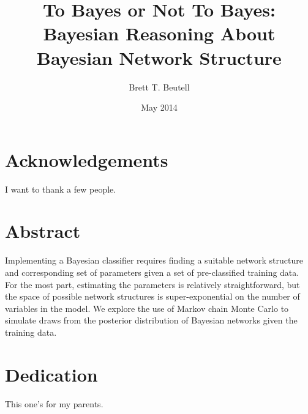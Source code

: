 \documentclass[12pt,twoside]{reedthesis}
\title{To Bayes or Not To Bayes: Bayesian Reasoning About Bayesian Network Structure}
\author{Brett T. Beutell}
\date{May 2014}
\begin{document}
  \maketitle
  \frontmatter %
  \pagestyle{empty} %

    \chapter*{Acknowledgements}
	I want to thank a few people.


    \tableofcontents

    \chapter*{Abstract}
	Implementing a Bayesian classifier requires finding a suitable network structure and corresponding set of parameters given a set of pre-classified training data. For the most part, estimating the parameters is relatively straightforward, but the space of possible network structures is super-exponential on the number of variables in the model. We explore the use of Markov chain Monte Carlo to simulate draws from the posterior distribution of Bayesian networks given the training data.
	
	\chapter*{Dedication}
	This one's for my parents.

  \mainmatter %
  \pagestyle{fancyplain} %

\end{document}
